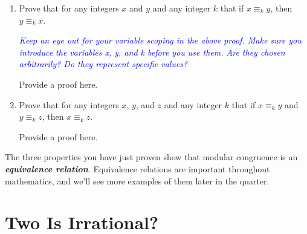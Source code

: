 \documentclass{article}
\renewcommand{\(}{\left(}
\renewcommand{\)}{\right)}
\theoremstyle{plain}
\theoremstyle{plain}
\theoremstyle{definition}
\begin{document}
\begin{enumerate}[resume*]

\item Prove that for any integers $x$ and $y$ and any integer $k$
that if $x \equiv_k y$, then $y \equiv_k x$.

\textit{\textcolor{blue}{ Keep an eye out for your variable scoping in the above proof. Make sure you introduce the variables x, y,
and k before you use them. Are they chosen arbitrarily? Do they represent specific values? }}

\begin{shaded}
Provide a proof here.
\end{shaded}

\item Prove that for any integers $x$, $y$, and $z$
and any integer $k$ that if $x \equiv_k y$ and $y \equiv_k z$,
then $x \equiv_k z$.

\begin{shaded}
Provide a proof here.
\end{shaded}

\end{enumerate}

The three properties you have just proven show that modular congruence is
an \textit{\textbf{equivalence relation}}. Equivalence relations are important throughout mathematics, and we'll see more examples of them later in the quarter.

\section{Two Is Irrational?}
\end{document}
